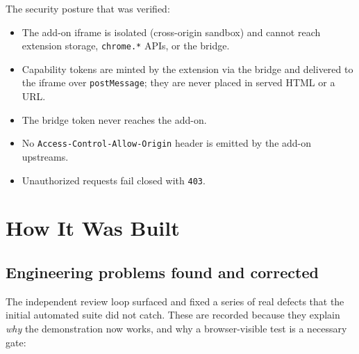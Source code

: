 \documentclass[11pt]{article}
\begin{document}
The security posture that was verified:

\begin{itemize}[leftmargin=1.5em]
  \item The add-on iframe is isolated (cross-origin sandbox) and cannot reach
        extension storage, \texttt{chrome.*} APIs, or the bridge.
  \item Capability tokens are minted by the extension via the bridge and
        delivered to the iframe over \texttt{postMessage}; they are never
        placed in served HTML or a URL.
  \item The bridge token never reaches the add-on.
  \item No \texttt{Access-Control-Allow-Origin} header is emitted by the add-on
        upstreams.
  \item Unauthorized requests fail closed with \texttt{403}.
\end{itemize}

\section{How It Was Built}

\subsection{Engineering problems found and corrected}

The independent review loop surfaced and fixed a series of real defects that
the initial automated suite did not catch. These are recorded because they
explain \emph{why} the demonstration now works, and why a browser-visible test
is a necessary gate:
\end{document}
